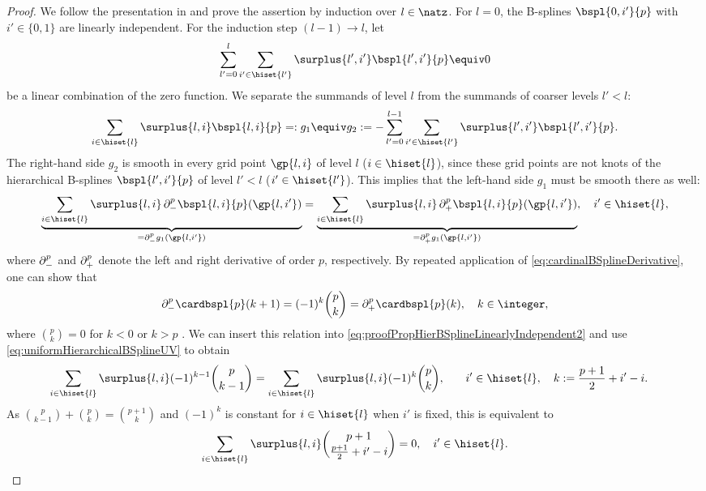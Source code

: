 \begin{proof}
  We follow the presentation in \cite{Valentin16Hierarchical} and
  prove the assertion by induction over $l \in \natz$.
  For $l = 0$, the B-splines $\bspl{0,i'}{p}$ with $i' \in \{0, 1\}$
  are linearly independent.
  For the induction step $(l-1) \to l$, let
  \begin{equation}
    \label{eq:proofPropHierBSplineLinearlyIndependent1}
    \sum_{l'=0}^l \sum_{i' \in \hiset{l'}} \surplus{l',i'} \bspl{l',i'}{p}
    \equiv 0
  \end{equation}
  be a linear combination of the zero function.
  We separate the summands of level $l$
  from the summands of coarser levels $l' < l$:
  \begin{equation}
    \sum_{i \in \hiset{l}} \surplus{l,i} \bspl{l,i}{p}
    =: g_1 \equiv g_2 :=
    -\sum_{l'=0}^{l-1} \sum_{i' \in \hiset{l'}} \surplus{l',i'} \bspl{l',i'}{p}.
  \end{equation}
  The right-hand side $g_2$ is smooth in every grid point
  $\gp{l,i}$ of level $l$ ($i \in \hiset{l}$),
  since these grid points are not knots of the hierarchical B-splines
  $\bspl{l',i'}{p}$ of level $l' < l$ ($i' \in \hiset{l'}$).
  This implies that the left-hand side $g_1$ must be smooth there as well:
  \begin{equation}
    \label{eq:proofPropHierBSplineLinearlyIndependent2}
    \underbrace{
      \sum_{i \in \hiset{l}} \surplus{l,i}
      \partialdiff_-^p \bspl{l,i}{p}(\gp{l,i'})
    }_{{} = \partialdiff_-^p g_1(\gp{l,i'})}
    =
    \underbrace{
      \sum_{i \in \hiset{l}} \surplus{l,i}
      \partialdiff_+^p \bspl{l,i}{p}(\gp{l,i'})
    }_{{} = \partialdiff_+^p g_1(\gp{l,i'})},\quad
    i' \in \hiset{l},
  \end{equation}
  where $\mathop{}\!\partial_-^p$ and $\mathop{}\!\partial_+^p$ denote the left and right
  derivative of order $p$, respectively.
  By repeated application of \eqref{eq:cardinalBSplineDerivative},
  one can show that
  \begin{equation}
    \partialdiff_-^p \cardbspl{p}(k + 1)
    = (-1)^k \binom{p}{k}
    = \partialdiff_+^p \cardbspl{p}(k),\quad
    k \in \integer,
  \end{equation}
  where $\binom{p}{k} = 0$ for $k < 0$ or $k > p$
  \cite{Hoellig13Approximation}.
  We can insert this relation into
  \eqref{eq:proofPropHierBSplineLinearlyIndependent2}
  and use \eqref{eq:uniformHierarchicalBSplineUV} to obtain
  \begin{alignat}{2}
    \sum_{i \in \hiset{l}} \surplus{l,i} (-1)^{k-1} \binom{p}{k-1}
    &= \sum_{i \in \hiset{l}} \surplus{l,i} (-1)^k \binom{p}{k},\quad
    &&i' \in \hiset{l},\quad
    k := \frac{p+1}{2} + i' - i.
  \end{alignat}
  As $\binom{p}{k-1} + \binom{p}{k} = \binom{p+1}{k}$
  and $(-1)^k$ is constant for $i \in \hiset{l}$ when $i'$ is fixed,
  this is equivalent to
  \begin{equation}
    \label{eq:proofPropHierBSplineLinearlyIndependent3}
    \sum_{i \in \hiset{l}} \surplus{l,i}
    \binom{p+1}{\frac{p+1}{2} + i' - i} = 0,\quad
    i' \in \hiset{l}.
  \end{equation}
  

\end{proof}
